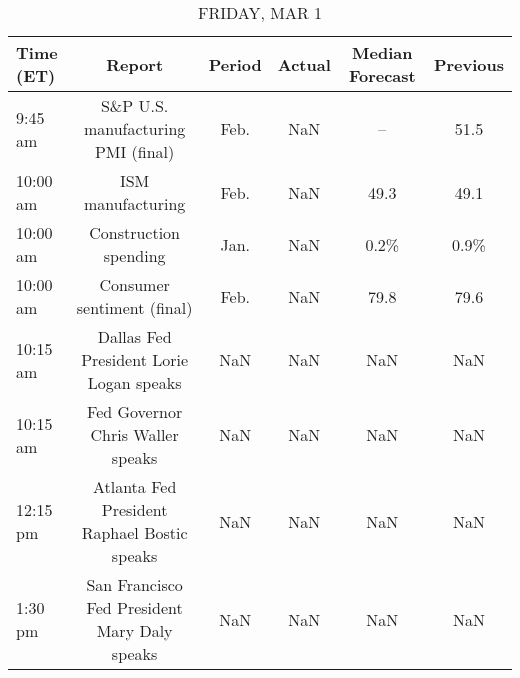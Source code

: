 \documentclass{article}%
\begin{document}
\begin{table}[htbp]%
\caption{FRIDAY, MAR 1}%
\centering%
\begin{adjustbox}{width=1\textwidth}%
\begin{tabular}{lccccc}
\toprule
Time (ET) &                                       Report & Period & Actual & Median Forecast & Previous \\
\midrule
  9:45 am &           S\&P U.S. manufacturing PMI (final) &   Feb. &    NaN &              -- &     51.5 \\
 10:00 am &                            ISM manufacturing &   Feb. &    NaN &            49.3 &     49.1 \\
 10:00 am &                        Construction spending &   Jan. &    NaN &            0.2\% &     0.9\% \\
 10:00 am &                   Consumer sentiment (final) &   Feb. &    NaN &            79.8 &     79.6 \\
 10:15 am &      Dallas Fed President Lorie Logan speaks &    NaN &    NaN &             NaN &      NaN \\
 10:15 am &             Fed Governor Chris Waller speaks &    NaN &    NaN &             NaN &      NaN \\
 12:15 pm &  Atlanta Fed President Raphael Bostic speaks &    NaN &    NaN &             NaN &      NaN \\
  1:30 pm & San Francisco Fed President Mary Daly speaks &    NaN &    NaN &             NaN &      NaN \\
\bottomrule
\end{tabular}
%
\end{adjustbox}%
\end{table}
\end{document}
